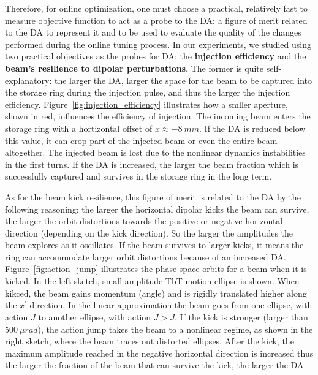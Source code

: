 Therefore, for online optimization, one must choose a practical, relatively fast to measure objective function to act as a probe to the DA: a figure of merit related to the DA to represent it and to be used to evaluate the quality of the changes performed during the online tuning process. In our experiments, we studied using two practical objectives as the probes for DA: the \textbf{injection efficiency} and the \textbf{beam's resilience to dipolar perturbations}. The former is quite self-explanatory: the larger the DA, larger the space for the beam to be captured into the storage ring during the injection pulse, and thus the larger the injection efficiency. Figure~\ref{fig:injection_efficiency}  illustrates how a smller aperture, shown in red, influences the efficiency of injection. The incoming beam enters the storage ring with a hortizontal offset of $x\approx -8~ \unit{mm}$. If the DA is reduced below this value, it can crop part of the injected beam or even the entire beam altogether. The injected beam is lost due to the nonlinear dynamics instabilities in the first turns. If the DA is increased, the larger the beam fraction which is successfully captured and survives in the storage ring in the long term.

As for the beam kick resilience, this figure of merit is related to the DA by the following reasoning: the larger the horizontal dipolar kicks the beam can survive, the larger the orbit distortions towards the positive or negative horizontal direction (depending on the kick direction). So the larger the amplitudes the beam explores as it oscillates. If the beam survives to larger kicks, it means the ring can accommodate larger orbit distortions because of an increased DA. Figure~\ref{fig:action_jump} illustrates the phase space orbits for a beam when it is kicked. In the left sketch, small amplitude TbT motion ellipse is shown. When kikced, the beam gains momentum (angle) and is rigidly translated higher along the $x^{\prime}$ direction. In the linear approximation the beam goes from one ellipse, with action $J$ to another ellipse, with action $\tilde{J}>J$. If the kick is stronger (larger than $500~\unit{\mu rad}$), the action jump takes the beam to a nonlinear regime, as shown in the right sketch, where the beam traces out distorted ellipses. After the kick, the maximum amplitude reached in the negative horizontal direction is increased thus the larger the fraction of the beam that can survive the kick, the larger the DA.

